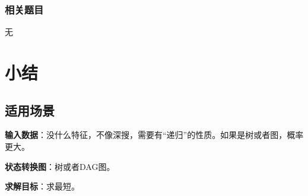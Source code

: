 \subsubsection{相关题目}

\begindot
\item 无
\myenddot


\section{小结} %
\label{sec:bfs-template}


\subsection{适用场景}

\textbf{输入数据}：没什么特征，不像深搜，需要有“递归”的性质。如果是树或者图，概率更大。

\textbf{状态转换图}：树或者DAG图。

\textbf{求解目标}：求最短。


